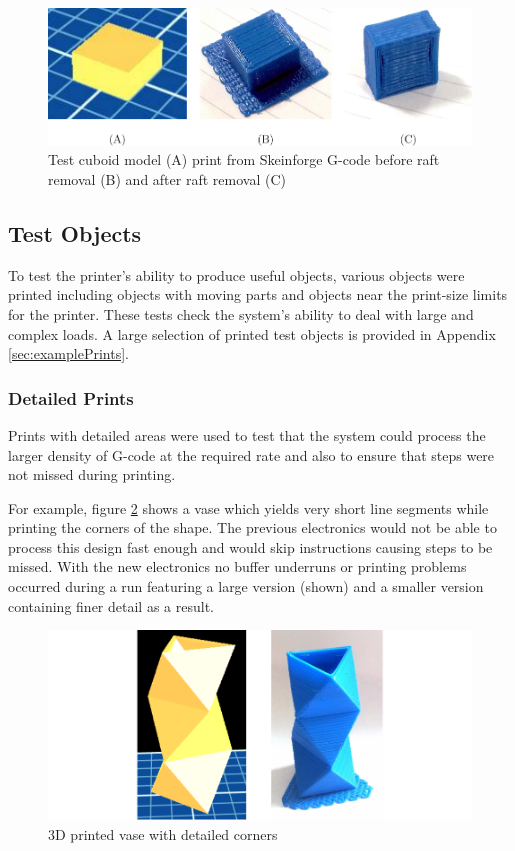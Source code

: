 			\begin{figure}
				\includegraphics[width=1\textwidth]{diagrams/testCubes.pdf}
				\caption{Test cuboid model (A) print from Skeinforge G-code before raft
				         removal (B) and after raft removal (C)}
				\label{fig:testCubes}
			\end{figure}
			
		
		\subsection{Test Objects}
			
			To test the printer's ability to produce useful objects, various objects
			were printed including objects with moving parts and objects near the
			print-size limits for the printer. These tests check the system's ability
			to deal with large and complex loads. A large selection of printed test
			objects is provided in Appendix \ref{sec:examplePrints}.
			
			\subsubsection{Detailed Prints}
				
				Prints with detailed areas were used to test that the system could
				process the larger density of G-code at the required rate and also to
				ensure that steps were not missed during printing.
				
				For example, figure \ref{fig:vase} shows a vase which yields very short
				line segments while printing the corners of the shape. The previous
				electronics would not be able to process this design fast enough and
				would skip instructions causing steps to be missed. With the new
				electronics no buffer underruns or printing problems occurred during a
				run featuring a large version (shown) and a smaller version containing
				finer detail as a result.
				
				\begin{figure}
					\includegraphics[width=1\textwidth]{diagrams/vase.pdf}
					\caption{3D printed vase with detailed corners}
					\label{fig:vase}
				\end{figure}
			
